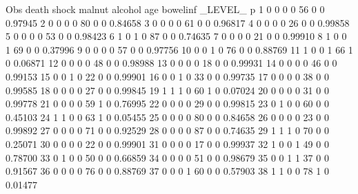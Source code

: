 \documentclass{article}
\begin{document}
\begin{Woutput}
Obs  death  shock  malnut  alcohol  age  bowelinf  _LEVEL_     p
  1    0      0       0       0      56      0        0     0.97945
  2    0      0       0       0      80      0        0     0.84658
  3    0      0       0       0      61      0        0     0.96817
  4    0      0       0       0      26      0        0     0.99858
  5    0      0       0       0      53      0        0     0.98423
  6    1      0       1       0      87      0        0     0.74635
  7    0      0       0       0      21      0        0     0.99910
  8    1      0       0       1      69      0        0     0.37996
  9    0      0       0       0      57      0        0     0.97756
 10    0      0       1       0      76      0        0     0.88769
 11    1      0       0       1      66      1        0     0.06871
 12    0      0       0       0      48      0        0     0.98988
 13    0      0       0       0      18      0        0     0.99931
 14    0      0       0       0      46      0        0     0.99153
 15    0      0       1       0      22      0        0     0.99901
 16    0      0       1       0      33      0        0     0.99735
 17    0      0       0       0      38      0        0     0.99585
 18    0      0       0       0      27      0        0     0.99845
 19    1      1       1       0      60      1        0     0.07024
 20    0      0       0       0      31      0        0     0.99778
 21    0      0       0       0      59      1        0     0.76995
 22    0      0       0       0      29      0        0     0.99815
 23    0      1       0       0      60      0        0     0.45103
 24    1      1       0       0      63      1        0     0.05455
 25    0      0       0       0      80      0        0     0.84658
 26    0      0       0       0      23      0        0     0.99892
 27    0      0       0       0      71      0        0     0.92529
 28    0      0       0       0      87      0        0     0.74635
 29    1      1       1       0      70      0        0     0.25071
 30    0      0       0       0      22      0        0     0.99901
 31    0      0       0       0      17      0        0     0.99937
 32    1      0       0       1      49      0        0     0.78700
 33    0      1       0       0      50      0        0     0.66859
 34    0      0       0       0      51      0        0     0.98679
 35    0      0       1       1      37      0        0     0.91567
 36    0      0       0       0      76      0        0     0.88769
 37    0      0       0       1      60      0        0     0.57903
 38    1      1       0       0      78      1        0     0.01477

\end{Woutput}
\end{document}

